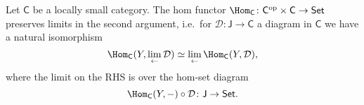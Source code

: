 \documentclass[notes.tex]{subfiles}
\begin{document}
\begin{theorem}
  \label{thm:homfunctorpreserveslimits}
  Let $\mathsf{C}$ be a locally small category. The hom functor $\Hom_{\mathsf{C}}\colon \mathsf{C}^{\mathrm{op}} \times \mathsf{C} \rightarrow \mathsf{Set}$ preserves limits in the second argument, i.e.~for $\mathcal{D}\colon \mathsf{J} \rightarrow \mathsf{C}$ a diagram in $\mathsf{C}$ we have a natural isomorphism
  \begin{equation*}
    \Hom_{\mathsf{C}}(Y, \lim_{\leftarrow}\mathcal{D}) \simeq \lim_{\leftarrow}\Hom_{\mathsf{C}}(Y, \mathcal{D}),
  \end{equation*}
  where the limit on the RHS is over the hom-set diagram
  \begin{equation*}
    \Hom_{\mathsf{C}}(Y, -) \circ \mathcal{D} \colon \mathsf{J} \rightarrow \mathsf{Set}.
  \end{equation*}
\end{theorem}
\end{document}
